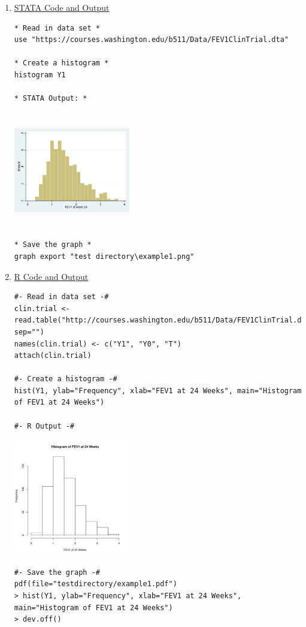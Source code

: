 \documentclass[11pt,letterpaper,fleqn]{report}
\begin{document}
\begin{enumerate}[]
\item \underline{STATA Code and Output}
{\scriptsize
\begin{verbatim}
* Read in data set *
use "https://courses.washington.edu/b511/Data/FEV1ClinTrial.dta"

* Create a histogram *
histogram Y1

* STATA Output: *
\end{verbatim}}
\includegraphics[height=2in, width=2in]{fev1hist.png}
{\scriptsize
\begin{verbatim}
* Save the graph *
graph export "test directory\example1.png"
\end{verbatim}}
\item \underline{R Code and Output}
{\scriptsize
\begin{verbatim}
#- Read in data set -#
clin.trial <- read.table("http://courses.washington.edu/b511/Data/FEV1ClinTrial.dat", sep="")
names(clin.trial) <- c("Y1", "Y0", "T")
attach(clin.trial)

#- Create a histogram -#
hist(Y1, ylab="Frequency", xlab="FEV1 at 24 Weeks", main="Histogram of FEV1 at 24 Weeks")

#- R Output -# 
\end{verbatim}}
\includegraphics[height=2in, width=2in]{fev1hist_R.pdf}
{\scriptsize
\begin{verbatim}
#- Save the graph -#
pdf(file="testdirectory/example1.pdf")
> hist(Y1, ylab="Frequency", xlab="FEV1 at 24 Weeks", main="Histogram of FEV1 at 24 Weeks")
> dev.off()


\end{verbatim}}
\end{enumerate}
\end{document}
